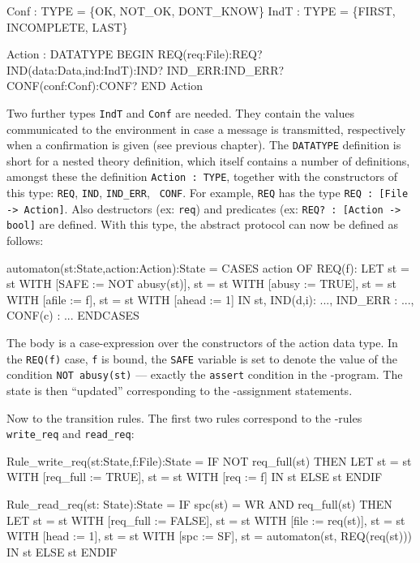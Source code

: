 \begin{smallsession}
  Conf : TYPE = \{OK, NOT_OK, DONT_KNOW\}
  IndT : TYPE = \{FIRST, INCOMPLETE, LAST\}

  Action : DATATYPE
    BEGIN
      REQ(req:File):REQ?
      IND(data:Data,ind:IndT):IND?
      IND_ERR:IND_ERR?
      CONF(conf:Conf):CONF?
    END Action
\end{smallsession}

Two further types {\tt IndT} and {\tt Conf} are  needed. They  contain
the  values  communicated to the environment  in  case  a  message  is
transmitted, respectively  when a confirmation is  given (see previous
chapter).   The {\tt DATATYPE} definition is short for a nested theory
definition,  which  itself contains a  number of  definitions,  amongst
these  the  definition  {\tt   Action  :  TYPE},  together   with  the
constructors of this type: {\tt  REQ}, {\tt  IND}, {\tt IND\_ERR}, {\tt
CONF}.  For example,  {\tt REQ} has the type  {\tt REQ  :
[File -> Action]}.   Also destructors  (ex:  {\tt req}) and predicates
(ex: {\tt REQ? :  [Action -> bool]} are defined. With  this  type, the
abstract protocol can now be defined as follows:

\begin{smallsession}
  automaton(st:State,action:Action):State =
    CASES action OF
      REQ(f):
        LET
          st = st WITH [SAFE := NOT abusy(st)],
          st = st WITH [abusy := TRUE],
          st = st WITH [afile := f],
          st = st WITH [ahead := 1]
        IN st,
      IND(d,i): ...,
      IND_ERR : ...,
      CONF(c) : ...
    ENDCASES
\end{smallsession}

The body is a  case-expression over  the constructors  of  the  action
data type.  In the {\tt REQ(f)} case, {\tt f} is bound, the  {\tt SAFE}
variable  is  set  to denote  the  value  of  the  condition  {\tt NOT
abusy(st)}   ---   exactly  the   {\tt   assert}   condition  in   the
\Murphi{}-program. The state is then ``updated''  corresponding  to the
\Murphi{}-assignment statements.

Now to the transition rules. The first two rules correspond to the
\Murphi{}-rules {\tt write\_req} and {\tt read\_req}:

\begin{smallsession}
  Rule_write_req(st:State,f:File):State =
    IF NOT req_full(st) THEN 
      LET 
        st = st WITH [req_full := TRUE],
        st = st WITH [req := f]
      IN st
    ELSE 
      st
    ENDIF

  Rule_read_req(st: State):State =
    IF spc(st) = WR AND req_full(st) THEN 
      LET 
        st = st WITH [req_full := FALSE],
        st = st WITH [file := req(st)],
        st = st WITH [head := 1],
        st = st WITH [spc  := SF],
        st = automaton(st, REQ(req(st)))
      IN st
    ELSE 
      st
    ENDIF
\end{smallsession}

